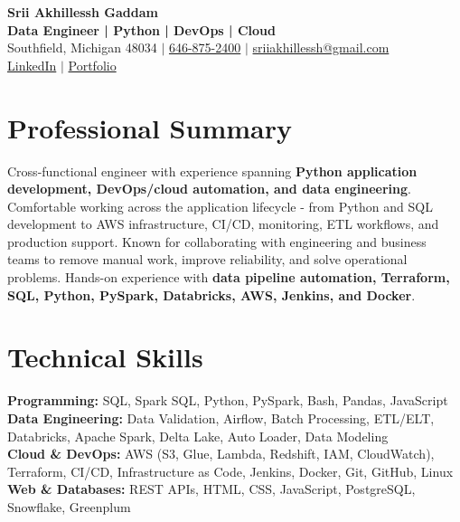 \documentclass[letterpaper,10pt]{article}
\begin{document}
\fontsize{9.35pt}{10.45pt}\selectfont

\begin{center}
    {\LARGE \textbf{Srii Akhillessh Gaddam}} \\[-1pt]
    \textbf{Data Engineer | Python | DevOps | Cloud} \\[2pt]
    Southfield, Michigan 48034 $|$
    \href{tel:6468752400}{646-875-2400} $|$
    \href{mailto:sriiakhillessh@gmail.com}{sriiakhillessh@gmail.com} \\[1pt]
    \href{https://www.linkedin.com/in/srii-akhiilessh-gaddam-b48668191/}{LinkedIn} $|$
    \href{https://sriiakhillesshg.github.io/portfolio/}{Portfolio}
\end{center}
\vspace{-8pt}

\section{Professional Summary}
\small{Cross-functional engineer with experience spanning \textbf{Python application development, DevOps/cloud automation, and data engineering}. Comfortable working across the application lifecycle - from Python and SQL development to AWS infrastructure, CI/CD, monitoring, ETL workflows, and production support. Known for collaborating with engineering and business teams to remove manual work, improve reliability, and solve operational problems. Hands-on experience with \textbf{data pipeline automation, Terraform, SQL, Python, PySpark, Databricks, AWS, Jenkins, and Docker}.}

\section{Technical Skills}
\small{
\textbf{Programming:} SQL, Spark SQL, Python, PySpark, Bash, Pandas, JavaScript \\
\textbf{Data Engineering:} Data Validation, Airflow, Batch Processing, ETL/ELT, Databricks, Apache Spark, Delta Lake, Auto Loader, Data Modeling \\
\textbf{Cloud \& DevOps:} AWS (S3, Glue, Lambda, Redshift, IAM, CloudWatch), Terraform, CI/CD, Infrastructure as Code, Jenkins, Docker, Git, GitHub, Linux \\
\textbf{Web \& Databases:} REST APIs, HTML, CSS, JavaScript, PostgreSQL, Snowflake, Greenplum
}
\end{document}
